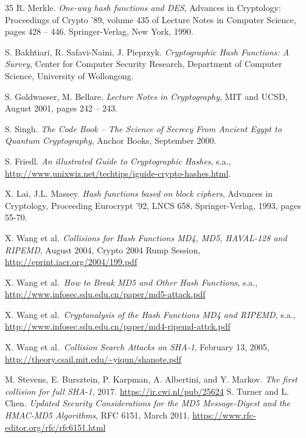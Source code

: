 \begin{thebibliography}{35}
R. Merkle. \emph{One-way hash functions and DES}, Advances in
Cryptology: Proceedings of Crypto '89, volume 435 of Lecture Notes in
Computer Science, pages 428 -- 446. Springer-Verlag, New York, 1990.

S. Bakhtiari, R. Safavi-Naini, J. Pieprzyk. \emph{Cryptographic Hash
Functions: A Survey}, Center for Computer Security Research, Department
of Computer Science, University of Wollongong.

S. Goldwasser, M. Bellare. \emph{Lecture Notes in Cryptography}, MIT and
UCSD, August 2001, pages 242 -- 243.

S. Singh. \emph{The Code Book -- The Science of Secrecy From Ancient
Egypt to Quantum Cryptography}, Anchor Books, September 2000.

S. Friedl. \emph{An illustrated Guide to Cryptographic Hashes}, s.a.,
\url{http://www.unixwiz.net/techtips/iguide-crypto-hashes.html}.

X. Lai, J.L. Massey. \emph{Hash functions based on block ciphers},
Advances in Cryptology, Proceeding Eurocrypt '92, LNCS 658,
Springer-Verlag, 1993, pages 55-70.

X. Wang et al\emph{. Collisions for Hash Functions MD4, MD5, HAVAL-128
and RIPEMD}, August 2004, Crypto 2004 Rump Session,
\url{http://eprint.iacr.org/2004/199.pdf}

X. Wang et al.~\emph{How to Break MD5 and Other Hash Functions}, s.a.,
\url{http://www.infosec.sdu.edu.cn/paper/md5-attack.pdf}

X. Wang et al.~\emph{Cryptanalysis of the Hash Functions MD4 and
RIPEMD}, s.a.,
\url{http://www.infosec.sdu.edu.cn/paper/md4-ripemd-attck.pdf}

X. Wang et al.~\emph{Collision Search Attacks on SHA-1}, February 13,
2005, \url{http://theory.csail.mit.edu/~yiqun/shanote.pdf}

M. Stevens, E. Bursztein, P. Karpman, A. Albertini, and Y. Markov.
\emph{The first collision for full SHA-1}, 2017.
\url{https://ir.cwi.nl/pub/25624}
S. Turner and L. Chen. \emph{Updated Security Considerations for the MD5
Message-Digest and the HMAC-MD5 Algorithms}, RFC 6151, March 2011.
\url{https://www.rfc-editor.org/rfc/rfc6151.html}
\end{thebibliography}
\endgroup
